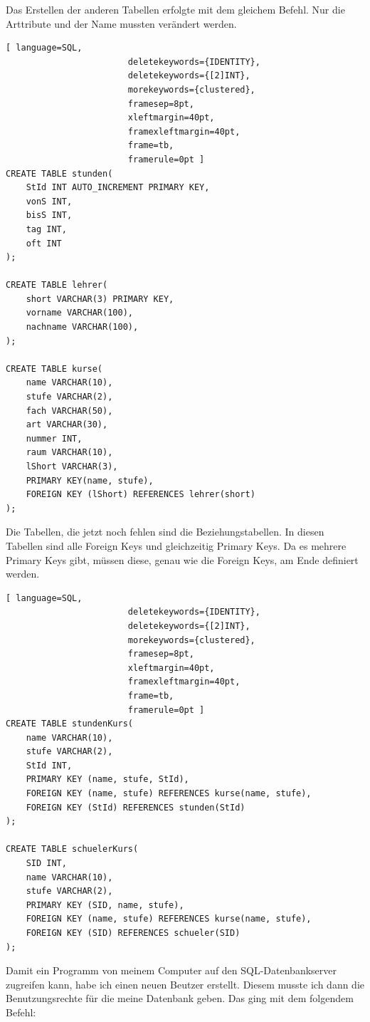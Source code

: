 \documentclass[a4paper, 12pt]{article}
\theoremstyle{plain}
\theoremstyle{definition}
\begin{document}
Das Erstellen der anderen Tabellen erfolgte mit dem gleichem Befehl. Nur die Arttribute und der Name mussten verändert werden.

	\begin{lstlisting}[ language=SQL,
	                    deletekeywords={IDENTITY},
	                    deletekeywords={[2]INT},
	                    morekeywords={clustered},
	                    framesep=8pt,
	                    xleftmargin=40pt,
	                    framexleftmargin=40pt,
	                    frame=tb,
	                    framerule=0pt ]
CREATE TABLE stunden(
	StId INT AUTO_INCREMENT PRIMARY KEY, 
	vonS INT, 
	bisS INT, 
	tag INT, 
	oft INT
);

CREATE TABLE lehrer(
	short VARCHAR(3) PRIMARY KEY,
	vorname VARCHAR(100), 
	nachname VARCHAR(100),
);

CREATE TABLE kurse(
	name VARCHAR(10), 
	stufe VARCHAR(2), 
	fach VARCHAR(50), 
	art VARCHAR(30),
	nummer INT,
	raum VARCHAR(10), 
	lShort VARCHAR(3), 
	PRIMARY KEY(name, stufe), 
	FOREIGN KEY (lShort) REFERENCES lehrer(short)
);\end{lstlisting}
Die Tabellen, die jetzt noch fehlen sind die Beziehungstabellen. In diesen Tabellen sind alle Foreign Keys und gleichzeitig Primary Keys. Da es mehrere Primary Keys gibt, müssen diese, genau wie die Foreign Keys, am Ende definiert werden.
	
		\begin{lstlisting}[ language=SQL,
	                    deletekeywords={IDENTITY},
	                    deletekeywords={[2]INT},
	                    morekeywords={clustered},
	                    framesep=8pt,
	                    xleftmargin=40pt,
	                    framexleftmargin=40pt,
	                    frame=tb,
	                    framerule=0pt ]
CREATE TABLE stundenKurs(
	name VARCHAR(10), 
	stufe VARCHAR(2), 
	StId INT, 
	PRIMARY KEY (name, stufe, StId),
	FOREIGN KEY (name, stufe) REFERENCES kurse(name, stufe), 
	FOREIGN KEY (StId) REFERENCES stunden(StId)
);

CREATE TABLE schuelerKurs(
	SID INT, 
	name VARCHAR(10), 
	stufe VARCHAR(2),
	PRIMARY KEY (SID, name, stufe),
	FOREIGN KEY (name, stufe) REFERENCES kurse(name, stufe), 
	FOREIGN KEY (SID) REFERENCES schueler(SID)
);\end{lstlisting}
Damit ein Programm von meinem Computer auf den SQL-Datenbankserver zugreifen kann, habe ich einen neuen Beutzer erstellt. Diesem musste ich dann die Benutzungsrechte für die meine Datenbank geben. Das ging mit dem folgendem Befehl:
	
\end{document}
